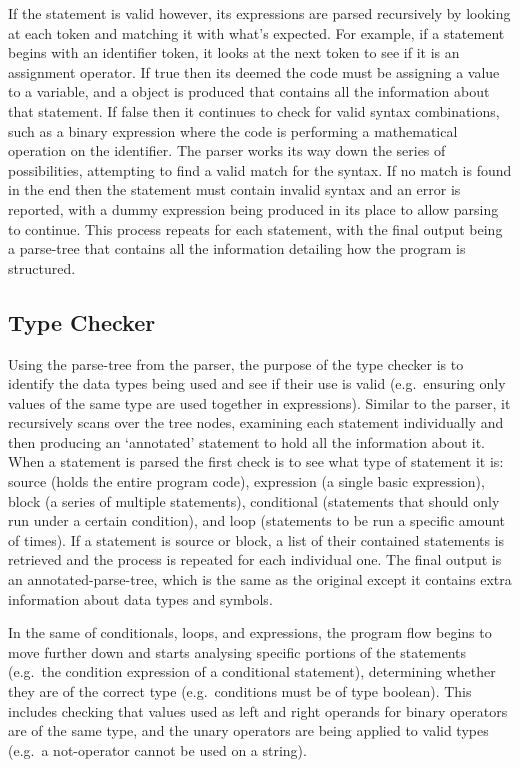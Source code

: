 \documentclass[
]{report}
\begin{document}
If the \gls{statement} is valid however, its \glspl{expression} are parsed
recursively by looking at each \gls{token} and matching it with what's
expected. For example, if a \gls{statement} begins with an \gls{identifier} \gls{token},
it looks at the next \gls{token} to see if it is an assignment operator. If
true then its deemed the code must be assigning a value to a variable,
and a object is produced that contains all the information about that
\gls{statement}. If false then it continues to check for valid syntax
combinations, such as a binary \gls{expression} where the code is performing a
mathematical operation on the \gls{identifier}. The parser works its way down
the series of possibilities, attempting to find a valid match for the
syntax. If no match is found in the end then the \gls{statement} must contain
invalid syntax and an error is reported, with a dummy \gls{expression} being
produced in its place to allow \gls{parsing} to continue. This process repeats
for each \gls{statement}, with the final output being a \gls{parse-tree} that
contains all the information detailing how the program is structured.

\subsection{Type Checker}
Using the \gls{parse-tree} from the parser, the purpose of the type checker is
to identify the data types being used and see if their use is valid
(e.g.~ensuring only values of the same type are used together in
\glspl{expression}). Similar to the parser, it recursively scans over the tree
nodes, examining each \gls{statement} individually and then producing an
`annotated' \gls{statement} to hold all the information about it. When a
\gls{statement} is parsed the first check is to see what type of \gls{statement} it
is: source (holds the entire program code), \gls{expression} (a single basic
\gls{expression}), block (a series of multiple \glspl{statement}), conditional
(\glspl{statement} that should only run under a certain condition), and loop
(\glspl{statement} to be run a specific amount of times). If a \gls{statement} is
source or block, a list of their contained \glspl{statement} is retrieved and
the process is repeated for each individual one. The final output is an
\gls{annotated-parse-tree}, which is the same as the original except it
contains extra information about data types and \glspl{symbol}.

In the same of conditionals, loops, and \glspl{expression}, the program flow
begins to move further down and starts analysing specific portions of
the \glspl{statement} (e.g.~the condition \gls{expression} of a conditional
\gls{statement}), determining whether they are of the correct type
(e.g.~conditions must be of type boolean). This includes checking that
values used as left and right operands for binary operators are of the
same type, and the unary operators are being applied to valid types
(e.g.~a not-operator cannot be used on a string).
\end{document}

